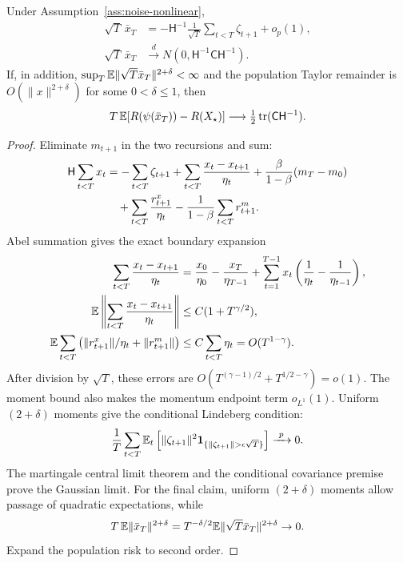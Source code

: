 \begin{theorem}
\label{thm:noise-nonlinear-average}
Under Assumption~\ref{ass:noise-nonlinear},
\begin{align}
\sqrt T\,\bar x_T
&=-\mathsf H^{-1}\frac1{\sqrt T}
\sum_{t<T}\zeta_{t+1}+o_p(1),\\
\sqrt T\,\bar x_T
&\xrightarrow{\ d\ }
N(0,\mathsf H^{-1}\mathsf C\mathsf H^{-1}).
\label{eq:noise-nonlinear-average}
\end{align}
If, in addition, $\sup_T\mathbb E\|\sqrt T\bar x_T\|^{2+\delta}<\infty$
and the population Taylor remainder is
$O(\|x\|^{2+\delta})$ for some $0<\delta\leq1$, then
\begin{equation}
T\,\mathbb E[R(\psi(\bar x_T))-R(X_\star)]
\longrightarrow\tfrac12\operatorname{tr}(\mathsf C\mathsf H^{-1}).
\label{eq:noise-nonlinear-risk}
\end{equation}
\end{theorem}
\begin{proof}
Eliminate $m_{t+1}$ in the two recursions and sum:
\begin{align}
\mathsf H\sum_{t<T}x_t
&=-\sum_{t<T}\zeta_{t+1}
+\sum_{t<T}\frac{x_t-x_{t+1}}{\eta_t}
+\frac{\beta}{1-\beta}(m_T-m_0)\notag\\
&\quad+\sum_{t<T}\frac{r^x_{t+1}}{\eta_t}
-\frac1{1-\beta}\sum_{t<T}r^m_{t+1}.
\label{eq:noise-abel-identity}
\end{align}
Abel summation gives the exact boundary expansion
\begin{align}
\sum_{t<T}\frac{x_t-x_{t+1}}{\eta_t}
&=\frac{x_0}{\eta_0}-\frac{x_T}{\eta_{T-1}}
+\sum_{t=1}^{T-1}x_t
\left(\frac1{\eta_t}-\frac1{\eta_{t-1}}\right),\\
\mathbb E\left\|\sum_{t<T}\frac{x_t-x_{t+1}}{\eta_t}\right\|
&\leq C(1+T^{\gamma/2}),\\
\mathbb E\sum_{t<T}
\left(\|r^x_{t+1}\|/\eta_t+\|r^m_{t+1}\|\right)
&\leq C\sum_{t<T}\eta_t=O(T^{1-\gamma}).
\end{align}
After division by $\sqrt T$, these errors are
$O(T^{(\gamma-1)/2}+T^{1/2-\gamma})=o(1)$.
The moment bound also makes the momentum endpoint term $o_{L^1}(1)$.
Uniform $(2+\delta)$ moments give the conditional Lindeberg condition:
\begin{equation}
\frac1T\sum_{t<T}\E_t\left[
\|\zeta_{t+1}\|^2\mathbf1_{\{\|\zeta_{t+1}\|>\epsilon\sqrt T\}}
\right]\xrightarrow{\ p\ }0 .
\end{equation}
The martingale central limit theorem and the conditional covariance
premise prove the Gaussian limit. For the final claim, uniform
$(2+\delta)$ moments allow passage of quadratic expectations, while
\begin{equation}
T\,\mathbb E\|\bar x_T\|^{2+\delta}
=T^{-\delta/2}\mathbb E\|\sqrt T\bar x_T\|^{2+\delta}\to0 .
\end{equation}
Expand the population risk to second order.
\end{proof}

